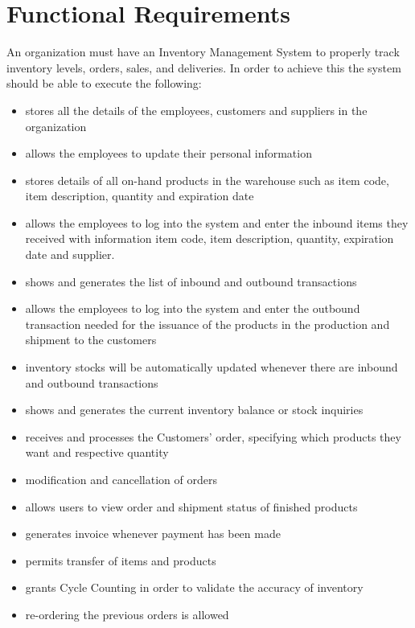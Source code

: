 \section{Functional Requirements}

An organization must have an Inventory Management System to properly track inventory levels, orders, sales, and deliveries. In order to achieve this the system should be able to execute the following:

\begin{itemize}
    \item stores all the details of the employees, customers and suppliers in the organization
    \item allows the employees to update their personal information
    \item stores details of all on-hand products in the warehouse such as item code, item description, quantity and expiration date
    \item allows the employees to log into the system and enter the inbound items they received with information item code, item description, quantity, expiration date and supplier. 
    \item shows and generates the list of inbound and outbound transactions
    \item allows the employees to log into the system and enter the outbound transaction needed for the issuance of the products in the production and shipment to the customers
    \item inventory stocks will be automatically updated whenever there are inbound and outbound transactions
    \item shows and generates the current inventory balance or stock inquiries
    \item receives and processes the Customers’ order, specifying which products they want and respective quantity
    \item modification and cancellation of orders
    \item allows users to view order and shipment status of finished products
    \item generates invoice whenever payment has been made
    \item permits transfer of items and products
    \item grants Cycle Counting in order to validate the accuracy of inventory
    \item re-ordering the previous orders is allowed
\end{itemize}